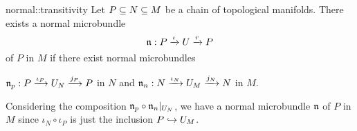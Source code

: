 \begin{mylemma}{normal::transitivity}{}
    Let $P \sub N \sub M$ be a chain of topological manifolds.
    There exists a normal microbundle
    \[ \bundledef{\bn}{P}{U}{\iota}{r} \]
    of $P$ in $M$ if there exist normal microbundles
    \begin{center}
        $\bundledef{\bn_p}{P}{U_N}{\iota_P}{j_P}$ in $N$ and $\bundledef{\bn_n}{N}{U_M}{\iota_N}{j_N}$ in $M$.
    \end{center}
\end{mylemma}

\begin{myproof}
    Considering the composition $\bn_p \circ \bn_n\restr{U_N}$,
    we have a normal microbundle $\bn$ of $P$ in $M$
    since $\iota_N \circ \iota_P$ is just the inclusion $P \incl U_M$.
\end{myproof}